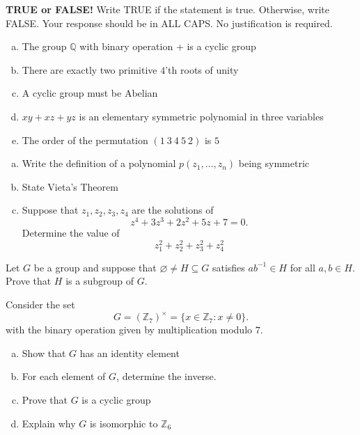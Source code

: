 \documentclass[11pt]{exam}
\theoremstyle{definition}
\begin{document}
\begin{questions}

\addpoints

\question[10]\mbox{}
\textbf{TRUE or FALSE!}  Write  TRUE if the statement is true.  Otherwise, write FALSE.  Your response should be in ALL CAPS.  No justification is required.
\begin{enumerate}[(a)]
\item  The group $\mathbb Q$ with binary operation $+$ is a cyclic group
\vspace{1.3in}
\item  There are exactly two primitive $4$'th roots of unity
\vspace{1.3in}
\item  A cyclic group must be Abelian
\vspace{1.3in}
\item  $xy+xz+yz$ is an elementary symmetric polynomial in three variables
\vspace{1.3in}
\item  The order of the permutation $(1\ 3\ 4\ 5\ 2)$ is $5$
\vspace{1.3in}
\end{enumerate}

\newpage
\question[10]\mbox{}
\begin{enumerate}[(a)]
\item  Write the definition of a polynomial $p(z_1,\dots, z_n)$ being symmetric
\vspace{1in}
\item  State Vieta's Theorem
\vspace{3in}
\item  Suppose that $z_1,z_2,z_3,z_4$ are the solutions of
$$z^4 + 3z^3 + 2z^2 + 5z + 7 = 0.$$
Determine the value of
$$z_1^2+z_2^2+z_3^2+z_4^2$$
\end{enumerate}

\newpage
\question[10]\mbox{}
Let $G$ be a group and suppose that $\varnothing\neq H\subseteq G$ satisfies $ab^{-1}\in H$ for all $a,b\in H$.  Prove that $H$ is a subgroup of $G$.

\newpage
\question[10]\mbox{}
Consider the set
$$G = (\mathbb{Z}_{7})^\times = \{x\in\mathbb{Z}_{7}: x\neq 0\}.$$
with the binary operation given by multiplication modulo $7$.
\begin{enumerate}[(a)]
\item Show that $G$ has an identity element
\vspace{1.5in}
\item For each element of $G$, determine the inverse.
\vspace{3in}
\item Prove that $G$ is a cyclic group
\vspace{2in}
\item Explain why $G$ is isomorphic to $\mathbb{Z}_6$
\end{enumerate}


\end{questions}
\end{document}

